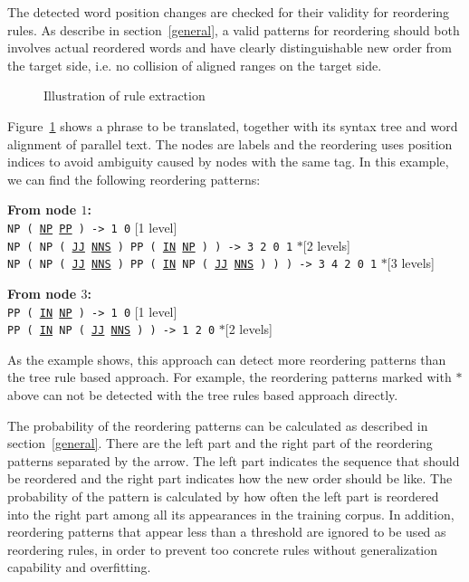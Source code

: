 The detected word position changes are checked for their validity for reordering rules. As describe in section~\ref{general}, a valid patterns for reordering should both involves actual reordered words and have clearly distinguishable new order from the target side, i.e. no collision of aligned ranges on the target side.

\begin{figure}[H]
\centering

\caption{Illustration of rule extraction}
\label{extract}
\end{figure}

Figure~\ref{extract} shows a phrase to be translated, together with its syntax tree and word alignment of parallel text. The nodes are labels and the reordering uses position indices to avoid ambiguity caused by nodes with the same tag. In this example, we can find the following reordering patterns:

\textbf{From node $1$:}\\
\texttt{NP ( \ul{NP} \ul{PP} ) -> 1 0} \hfill [1 level]\\
\texttt{NP ( NP ( \ul{JJ} \ul{NNS} ) PP ( \ul{IN} \ul{NP} ) ) -> 3 2 0 1} \hfill $*$[2 levels]\\
\texttt{NP ( NP ( \ul{JJ} \ul{NNS} ) PP ( \ul{IN} NP ( \ul{JJ} \ul{NNS} ) ) ) -> 3 4 2 0 1} \hfill $*$[3 levels]

\textbf{From node $3$:}\\
\texttt{PP ( \ul{IN} \ul{NP} ) -> 1 0} \hfill [1 level]\\
\texttt{PP ( \ul{IN} NP ( \ul{JJ} \ul{NNS} ) ) -> 1 2 0} \hfill $*$[2 levels]

As the example shows, this approach can detect more reordering patterns than the tree rule based approach. For example, the reordering patterns marked with $*$ above can not be detected with the tree rules based approach directly.

The probability of the reordering patterns can be calculated as described in section~\ref{general}. There are the left part and the right part of the reordering patterns separated by the arrow. The left part indicates the sequence that should be reordered and the right part indicates how the new order should be like. The probability of the pattern is calculated by how often the left part is reordered into the right part among all its appearances in the training corpus. In addition, reordering patterns that appear less than a threshold are ignored to be used as reordering rules, in order to prevent too concrete rules without generalization capability and overfitting.

